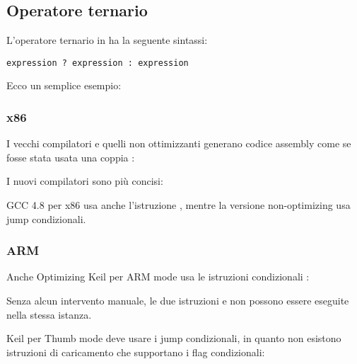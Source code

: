 \subsection{Operatore ternario}
\label{chap:cond}

L'operatore ternario in \CCpp ha la seguente sintassi:

\begin{lstlisting}
expression ? expression : expression
\end{lstlisting}

Ecco un semplice esempio:



\subsubsection{x86}

I vecchi compilatori e quelli non ottimizzanti generano codice assembly come se fosse stata usata una coppia :





I nuovi compilatori sono più concisi:



\Optimizing GCC 4.8 per x86 usa anche l'istruzione , mentre la versione non-optimizing usa jump condizionali.

\subsubsection{ARM}

Anche Optimizing Keil per ARM mode usa le istruzioni condizionali :



Senza alcun intervento manuale, le due istruzioni  e  non possono essere eseguite nella stessa istanza.

\Optimizing Keil per Thumb mode deve usare i jump condizionali, in quanto non esistono istruzioni di caricamento che supportano i flag condizionali:

